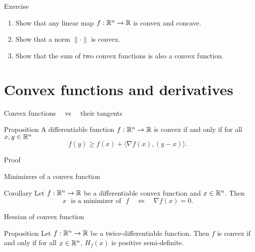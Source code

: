 \documentclass{beamer}
\begin{document}
\begin{frame}[t]{Exercise}
	\grid

	\vspace{-0.4cm}

	\begin{enumerate}
		\item Show that any linear map $f:\mathbb{R}^n \to \mathbb{R}$ is convex and concave.
		\item Show that a norm $\| \cdot \|$ is convex.
		\item Show that the sum of two convex functions is also a convex function.
	\end{enumerate}
\end{frame}



\section{Convex functions and derivatives}

\begin{frame}[t]{Convex functions \ \ vs \ \ their tangents}
	\grid

	\vspace{-0.4cm}

	\begin{block}{Proposition}
		A differentiable function $f: \mathbb{R}^n \to \mathbb{R}$ is convex if and only if for all $x,y \in \mathbb{R}^n$
		$$
		f(y) \geq f(x) + \langle \nabla f(x), (y-x) \rangle.
		$$
	\end{block}

\end{frame}
\begin{frame}[t]{Proof}
	\grid

	\pause
	\pause
\end{frame}


\begin{frame}[t]{Minimizers of a convex function}
	\grid

	\vspace{-0.4cm}

	\begin{block}{Corollary}
	Let $f: \mathbb{R}^n \to \mathbb{R}$ be a differentiable convex function and $x \in \mathbb{R}^n$. Then
	$$
	x \ \ \ \text{is a minimizer of} \ \ \ f
	\quad \Longleftrightarrow \quad \nabla f(x) = 0.
	$$
	\end{block}

\end{frame}

\begin{frame}[t]{Hessian of convex function}
	\grid

	\vspace{-0.4cm}

	\begin{block}{Proposition}
	Let $f: \mathbb{R}^n \to \mathbb{R}$ be a twice-differentiable function. 
	Then $f$ is convex if and only if for all $x \in \mathbb{R}^n$, $H_f(x)$ is positive semi-definite.
	\end{block}

	\pause
\end{frame}
\end{document}
